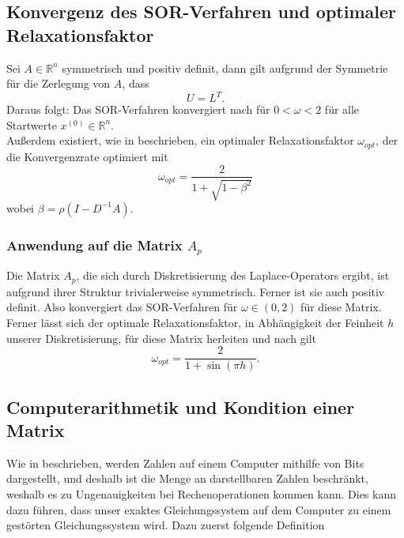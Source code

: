 \documentclass{scrartcl}
\begin{document}
\subsection{Konvergenz des SOR-Verfahren und optimaler Relaxationsfaktor}
\begin{theorem}
    Sei \(A \in \mathbb{R}^n\) symmetrisch und positiv definit, dann gilt aufgrund der Symmetrie
    für die Zerlegung von \(A\), dass
    \[U = L^T.\]
    Daraus folgt: Das SOR-Verfahren konvergiert nach \cite[p.~183-185]{SOR} für \(0 < \omega < 2\) für alle
    Startwerte \(x^{(0)} \in \mathbb{R}^n\). \\
    Außerdem existiert, wie in \cite[p.~4]{omega_opt} beschrieben, ein optimaler Relaxationsfaktor \(\omega_{opt}\), der die Konvergenzrate optimiert mit
    \[\omega_{opt}=\frac{2}{1+\sqrt{1-\beta^2}}\]
    wobei \(\beta=\rho(I-D^{-1}A)\).
\end{theorem}

\subsubsection{Anwendung auf die Matrix \(A_{p}\)}
Die Matrix \(A_p\), die sich durch Diskretisierung des Laplace-Operators ergibt, ist aufgrund ihrer Struktur trivialerweise symmetrisch. Ferner ist sie auch positiv definit\cite[p.~11]{PosDef}.
Also konvergiert das SOR-Verfahren für \(\omega \in (0, 2)\) für diese Matrix.
\\
Ferner lässt sich der optimale Relaxationsfaktor, in Abhängigkeit der Feinheit \(h\) unserer Diskretisierung, für diese Matrix herleiten und nach \cite{omega_opt} gilt
\[\omega_{opt}=\frac{2}{1+\sin(\pi h)}.\] 


\subsection{Computerarithmetik und Kondition einer Matrix}
Wie in \cite[p.~3]{HandoutFiniteDifferenzen} beschrieben, werden Zahlen auf einem Computer mithilfe von Bits dargestellt, und deshalb ist die Menge
an darstellbaren Zahlen beschränkt, weshalb es zu Ungenauigkeiten bei Rechenoperationen kommen kann.
Dies kann dazu führen, dass unser exaktes Gleichungssystem auf dem Computer zu einem gestörten
Gleichungssystem wird.
Dazu zuerst folgende Definition
\end{document}
